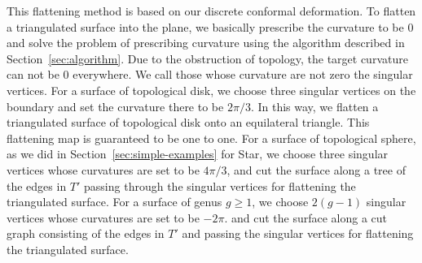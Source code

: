 \documentclass[11pt]{article}
\begin{document}
\vspace{0.1in}
This flattening method is based on our discrete conformal deformation. To flatten a triangulated surface
into the plane, we basically prescribe the curvature to be $0$ and solve the problem of prescribing 
curvature using the algorithm described in Section~\ref{sec:algorithm}. Due to the obstruction of 
topology, the target curvature can not be $0$ everywhere. We call those whose curvature are not zero 
the singular vertices. For a surface of topological disk, we choose three singular vertices on the boundary
and set the curvature there to be $2\pi/3$. In this way, we flatten a triangulated surface of topological
disk onto an equilateral triangle. This flattening map is guaranteed to be one to one. For a surface of 
topological sphere, as we did in Section~\ref{sec:simple-examples} for Star, we choose three singular 
vertices whose curvatures are set to be $4\pi/3$, and cut the surface along a tree of the edges in $T'$
passing through the singular vertices for flattening the triangulated surface. 
For a surface of genus $g\geq 1$, we choose $2(g-1)$ singular vertices whose curvatures are set to be $-2\pi$. 
and cut the surface along a cut graph consisting of the edges in $T'$ and passing the singular vertices 
for flattening the triangulated surface.  
\end{document}
